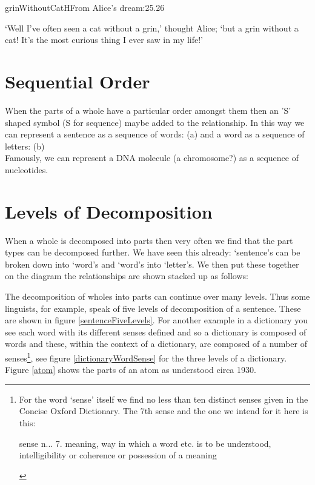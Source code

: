 \begin{ernotedDimFigPW}{grinWithoutCat}{H}{From Alice's dream:}{2}{5.2}{6}
\item{`Well I've often seen a cat without a grin,' thought Alice; `but a grin without a cat! It's the most 
curious thing I ever saw in my life!'}
\end{ernotedDimFigPW}

\section{Sequential Order}

\noindent When the parts of a whole have a particular order amongst them then an 'S' shaped symbol (S for sequence) maybe added to the relationship. In this way we can represent a sentence as a sequence of words: (a) and a word as a sequence of letters: (b)
\\

\noindent Famously, we can represent a DNA molecule (a chromosome?)  as a sequence of nucleotides.

\section{Levels of Decomposition}

\noindent When a whole is decomposed into parts then very often we find that the part types can be decomposed further. We have seen this already: `sentence's can be broken down into `word's and `word's into `letter's. We then put these together on the diagram the relationships are shown stacked up as follows:

\noindent The decomposition of wholes into parts can continue over many levels. Thus some linguists, for example, speak of five levels of decomposition of a sentence. These are shown in figure \ref{sentenceFiveLevels}. For another example
in a dictionary you see each word with its different senses defined and so a dictionary is composed of words and these, within the context of a dictionary, 
are composed of a number of senses\footnote{ For the word `sense' itself we find 
no less than ten distinct senses given in the Concise Oxford Dictionary. 
The 7th sense and the one we intend for it here is this:
\begin{erquote}
\noindent sense n... 7. meaning, way in which a word etc. is to be understood, intelligibility or coherence or possession of a meaning
\end{erquote}
}, see figure \ref{dictionaryWordSense} for the three levels of a dictionary. Figure \ref{atom} shows the parts of an atom as understood circa 1930.


